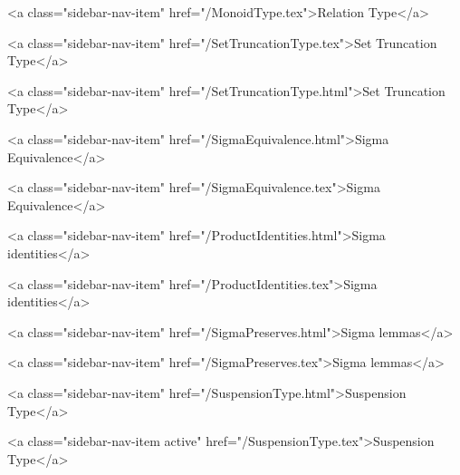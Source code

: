      
    
      
        
          <a class="sidebar-nav-item" href="/MonoidType.tex">Relation Type</a>
        
      
    
      
        
          <a class="sidebar-nav-item" href="/SetTruncationType.tex">Set Truncation Type</a>
        
      
    
      
        
          <a class="sidebar-nav-item" href="/SetTruncationType.html">Set Truncation Type</a>
        
      
    
      
        
          <a class="sidebar-nav-item" href="/SigmaEquivalence.html">Sigma Equivalence</a>
        
      
    
      
        
          <a class="sidebar-nav-item" href="/SigmaEquivalence.tex">Sigma Equivalence</a>
        
      
    
      
        
          <a class="sidebar-nav-item" href="/ProductIdentities.html">Sigma identities</a>
        
      
    
      
        
          <a class="sidebar-nav-item" href="/ProductIdentities.tex">Sigma identities</a>
        
      
    
      
        
          <a class="sidebar-nav-item" href="/SigmaPreserves.html">Sigma lemmas</a>
        
      
    
      
        
          <a class="sidebar-nav-item" href="/SigmaPreserves.tex">Sigma lemmas</a>
        
      
    
      
        
          <a class="sidebar-nav-item" href="/SuspensionType.html">Suspension Type</a>
        
      
    
      
        
          <a class="sidebar-nav-item active" href="/SuspensionType.tex">Suspension Type</a>
        
